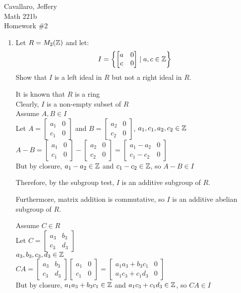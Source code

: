\documentclass[letterpaper,12pt,fleqn]{article}
\begin{document}
Cavallaro, Jeffery \\
Math 221b \\
Homework \#2

\bigskip

\begin{enumerate}

  \newcommand{\ma}{\begin{bmatrix} a_1 & 0 \\ c_1 & 0 \end{bmatrix}}
  \newcommand{\mb}{\begin{bmatrix} a_2 & 0 \\ c_2 & 0 \end{bmatrix}}
  \newcommand{\mc}{\begin{bmatrix} a_3 & b_3 \\ c_3 & d_3 \end{bmatrix}}
  
\item Let $R=M_2(\mathbb{Z})$ and let:
  \[I=\left\{\begin{bmatrix} a & 0 \\ c & 0 \end{bmatrix}
  \mid a,c\in\mathbb{Z}\right\}\]
  Show that $I$ is a left ideal in $R$ but not a right ideal in $R$.

  It is known that $R$ is a ring \\
  Clearly, $I$ is a non-empty subset of $R$ \\
  Assume $A,B\in I$ \\
  Let $A=\ma$ and $B=\mb$, $a_1,c_1,a_2,c_2\in\mathbb{Z}$ \\
  $A-B=\ma-\mb=\begin{bmatrix} a_1-a_2 & 0 \\ c_1-c_2 & 0 \end{bmatrix}$ \\
  But by closure, $a_1-a_2\in\mathbb{Z}$ and $c_1-c_2\in\mathbb{Z}$, so $A-B\in I$
  
  Therefore, by the subgroup test, $I$ is an additive subgroup of $R$.

  Furthermore, matrix addition is commutative, so $I$ is an additive abelian
  subgroup of $R$.

  Assume $C\in R$ \\
  Let $C=\mc$ \\
  $a_3,b_3,c_3,d_3\in\mathbb{Z}$ \\
  $CA=\mc\ma=\begin{bmatrix}a_1a_3+b_3c_1 & 0 \\ a_1c_3+c_1d_3 & 0\end{bmatrix}$ \\
  But by closure, $a_1a_3+b_3c_1\in\mathbb{Z}$ and $a_1c_3+c_1d_3\in\mathbb{Z}$, so $CA\in I$


\end{enumerate}
\end{document}
